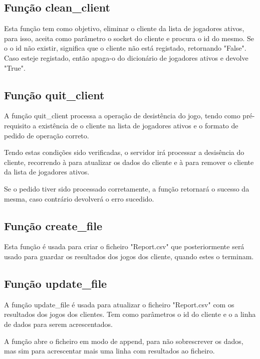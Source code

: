 \documentclass{report}
\begin{document}
\subsection{Função clean\_client}
\label{ssec:func_clean_client}

Esta função tem como objetivo, eliminar o cliente da lista de jogadores ativos, para isso, aceita como parâmetro o socket do cliente e procura o id do mesmo. Se o o id não existir, significa que o cliente não está registado, retornando "False". Caso esteje registado, então apaga-o do dicionário de jogadores ativos e devolve "True".

\subsection{Função quit\_client}
\label{ssec:func_quit_client}

A função quit\_client processa a operação de desistência do jogo, tendo como pré-requisito a existência de o cliente na lista de jogadores ativos e o formato de pedido de operação correto.

Tendo estas condições sido verificadas, o servidor irá processar a desisência do cliente, recorrendo à  para atualizar os dados do cliente e à  para remover o cliente da lista de jogadores ativos.

Se o pedido tiver sido processado corretamente, a função retornará o sucesso da mesma, caso contrário devolverá o erro sucedido.

\subsection{Função create\_file}
\label{ssec:func_create_file}

Esta função é usada para criar o ficheiro "Report.csv" que posteriormente será usado para guardar os resultados dos jogos dos cliente, quando estes o terminam.

\subsection{Função update\_file}
\label{ssec:func_update_file}

A função update\_file é usada para atualizar o ficheiro "Report.csv" com os resultados dos jogos dos clientes. Tem como parâmetros o id do cliente e o a linha de dados para serem acrescentados.

A função abre o ficheiro em modo de append, para não sobrescrever os dados, mas sim para acrescentar mais uma linha com resultados ao ficheiro.
\end{document}
